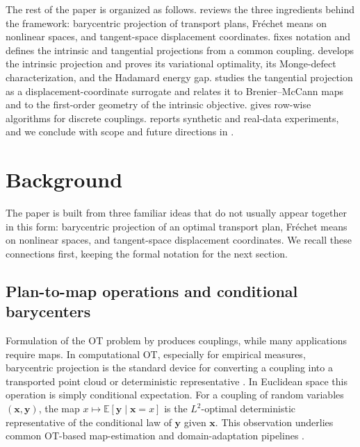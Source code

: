 \documentclass[10pt]{article} %
\theoremstyle{definition}
\providecommand{\E}{\mathbb{E}}
\providecommand{\1}{\mathbf{1}}
\providecommand{\rvx}{\mathbf{x}}
\providecommand{\rvy}{\mathbf{y}}
\providecommand{\Frechet}{Fr\'{e}chet\xspace}
\begin{document}
The rest of the paper is organized as follows. 
reviews the three ingredients behind the framework: barycentric projection of
transport plans, Fr\'echet means on nonlinear spaces, and tangent-space
displacement coordinates.  fixes notation and defines the
intrinsic and tangential projections from a common coupling. 
develops the intrinsic projection and proves its variational optimality, its
Monge-defect characterization, and the Hadamard energy gap. 
studies the tangential projection as a displacement-coordinate surrogate and
relates it to Brenier--McCann maps and to the first-order geometry of the
intrinsic objective.  gives row-wise algorithms for
discrete couplings.  reports synthetic and real-data
experiments, and we conclude with scope and future directions in  .







\section{Background}
\label{sec:background}

The paper is built from three familiar ideas that do not usually appear together in this form:  barycentric projection of an optimal transport plan, \Frechet means on nonlinear spaces, and tangent-space displacement coordinates. We recall these connections first, keeping the formal notation for the next section.


\subsection{Plan-to-map operations and conditional barycenters}

Formulation of the OT problem by \citet{kantorovitch_1958_TranslocationMasses} produces couplings, while many applications require maps. In computational OT, especially for empirical measures, barycentric projection is the standard device for converting a coupling into a transported point cloud or deterministic representative \citep{santambrogio_2015_OptimalTransportApplied, peyre_2019_ComputationalOptimalTransport}.  In Euclidean space this operation is simply conditional expectation. For a coupling of random variables $(\rvx,\rvy)$, the map $x\mapsto \E[\rvy\mid \rvx=x]$ is the $L^2$-optimal deterministic representative of the conditional law of $\rvy$ given $\rvx$. This observation underlies common OT-based map-estimation and domain-adaptation pipelines \citep{perrot_2016_MappingEstimationDiscrete,courty_2017_JointDistributionOptimal}.
\end{document}
